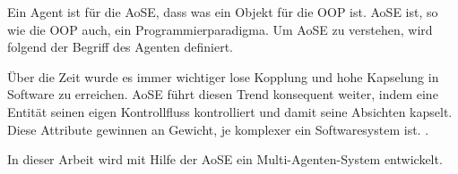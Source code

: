 Ein Agent ist für die AoSE, dass was ein Objekt für die OOP ist. AoSE ist, so wie die OOP auch, ein Programmierparadigma. Um AoSE zu verstehen, wird folgend der Begriff des Agenten definiert.


Über die Zeit wurde es immer wichtiger lose Kopplung und hohe Kapselung in Software zu erreichen. AoSE führt diesen Trend konsequent weiter, indem eine Entität seinen eigen Kontrollfluss kontrolliert und damit seine Absichten kapselt. Diese Attribute gewinnen an Gewicht, je komplexer ein Softwaresystem ist. \cite{article:flexibleSoftware}.

In dieser Arbeit wird mit Hilfe der AoSE ein Multi-Agenten-System entwickelt.